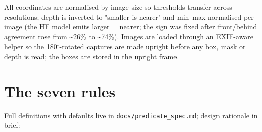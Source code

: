 All coordinates are normalised by image size so thresholds transfer across resolutions; depth is inverted to "smaller is nearer" and min--max normalised per image (the HF model emits larger = nearer; the sign was fixed after front/behind agreement rose from \textasciitilde{}26\% to \textasciitilde{}74\%). Images are loaded through an EXIF-aware helper so the 180$^{\circ}$-rotated captures are made upright before any box, mask or depth is read; the boxes are stored in the upright frame.

\section{The seven rules}

Full definitions with defaults live in \texttt{docs/predicate\_spec.md}; design rationale in brief:

